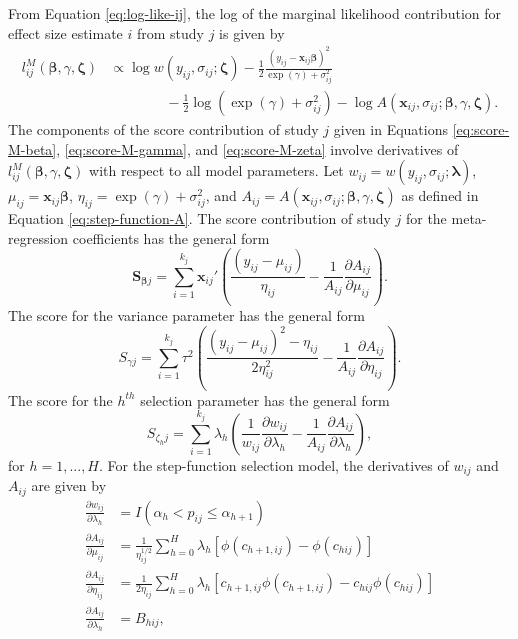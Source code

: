 \documentclass[
  man, donotrepeattitle,floatsintext]{apa7}
\begin{document}
From Equation \eqref{eq:log-like-ij}, the log of the marginal likelihood contribution for effect size estimate \(i\) from study \(j\) is given by
\begin{align}
l^M_{ij}\left(\boldsymbol\beta, \gamma, \boldsymbol\zeta \right) &\propto \log w\left(y_{ij}, \sigma_{ij}; \boldsymbol\zeta \right) - \frac{1}{2} \frac{\left(y_{ij} - \mathbf{x}_{ij} \boldsymbol\beta\right)^2}{\exp(\gamma) + \sigma_{ij}^2} \nonumber \\
& \qquad \qquad  - \frac{1}{2}\log\left(\exp(\gamma) + \sigma_{ij}^2\right) - \log A\left(\mathbf{x}_{ij}, \sigma_{ij}; \boldsymbol\beta, \gamma, \boldsymbol\zeta \right).
\end{align}
The components of the score contribution of study \(j\) given in Equations \eqref{eq:score-M-beta}, \eqref{eq:score-M-gamma}, and \eqref{eq:score-M-zeta} involve derivatives of \(l^M_{ij}\left(\boldsymbol\beta, \gamma, \boldsymbol\zeta \right)\) with respect to all model parameters.
Let \(w_{ij} = w\left(y_{ij}, \sigma_{ij}; \boldsymbol\lambda \right)\), \(\mu_{ij} = \mathbf{x}_{ij} \boldsymbol\beta\), \(\eta_{ij} = \exp(\gamma) + \sigma_{ij}^2\), and \(A_{ij} = A\left(\mathbf{x}_{ij}, \sigma_{ij}; \boldsymbol\beta, \gamma, \boldsymbol\zeta \right)\) as defined in Equation \eqref{eq:step-function-A}.
The score contribution of study \(j\) for the meta-regression coefficients has the general form
\begin{equation}
\mathbf{S}_{\boldsymbol\beta j} = \sum_{i=1}^{k_j} \mathbf{x}_{ij}' \left(\frac{\left(y_{ij} - \mu_{ij} \right)}{\eta_{ij}} - \frac{1}{A_{ij}}\frac{\partial A_{ij}}{\partial  \mu_{ij}}\right).
\end{equation}
The score for the variance parameter has the general form
\begin{equation}
S_{\gamma j} = \sum_{i=1}^{k_j} \tau^2 \left(\frac{\left(y_{ij} - \mu_{ij}\right)^2 - \eta_{ij}}{2\eta_{ij}^2} - \frac{1}{A_{ij}}\frac{\partial A_{ij}}{\partial \eta_{ij}}\right).
\end{equation}
The score for the \(h^{th}\) selection parameter has the general form
\begin{equation}
S_{\zeta_h j} = \sum_{i=1}^{k_j} \lambda_h \left(\frac{1}{w_{ij}}\frac{\partial w_{ij}}{\partial \lambda_{h}} - \frac{1}{A_{ij}}\frac{\partial A_{ij}}{\partial \lambda_{h}}\right),
\end{equation}
for \(h = 1,...,H\).
For the step-function selection model, the derivatives of \(w_{ij}\) and \(A_{ij}\) are given by
\begin{align}
\frac{\partial w_{ij}}{\partial \lambda_h} &= I\left(\alpha_h < p_{ij} \leq \alpha_{h+1}\right) \\
\label{eq:step-function-dAdmu}
\frac{\partial A_{ij}}{\partial \mu_{ij}} &= \frac{1}{\eta_{ij}^{1/2}} \sum_{h=0}^H \lambda_h \left[\phi\left(c_{h+1,ij}\right) - \phi\left(c_{hij}\right)\right] \\
\label{eq:step-function-dAdeta}
\frac{\partial A_{ij}}{\partial \eta_{ij}} &= \frac{1}{2\eta_{ij}} \sum_{h=0}^H \lambda_h \left[c_{h+1,ij} \phi\left(c_{h+1,ij}\right) - c_{hij} \phi\left(c_{hij}\right)\right] \\
\label{eq:step-function-dAdlambda}
\frac{\partial A_{ij}}{\partial \lambda_h} &= B_{hij},
\end{align}
\end{document}
